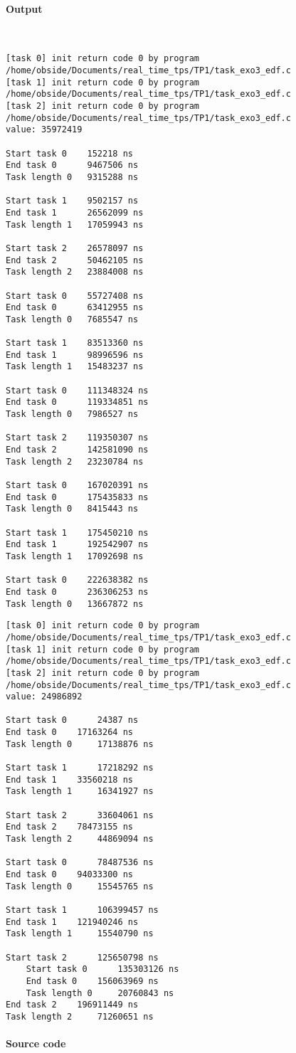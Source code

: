 \paragraph{Output}
\

\begin{lstlisting}[keywordstyle=\color{black}, caption={Output (reformatted) EDF 1\textsuperscript{st} set}]
[task 0] init return code 0 by program /home/obside/Documents/real_time_tps/TP1/task_exo3_edf.c
[task 1] init return code 0 by program /home/obside/Documents/real_time_tps/TP1/task_exo3_edf.c
[task 2] init return code 0 by program /home/obside/Documents/real_time_tps/TP1/task_exo3_edf.c
value: 35972419

Start task 0	152218 ns
End task 0		9467506 ns
Task length 0	9315288 ns

Start task 1	9502157 ns
End task 1		26562099 ns
Task length 1	17059943 ns

Start task 2	26578097 ns
End task 2		50462105 ns
Task length 2	23884008 ns

Start task 0	55727408 ns
End task 0		63412955 ns
Task length 0	7685547 ns

Start task 1	83513360 ns
End task 1		98996596 ns
Task length 1	15483237 ns

Start task 0	111348324 ns
End task 0		119334851 ns
Task length 0	7986527 ns

Start task 2	119350307 ns
End task 2		142581090 ns
Task length 2	23230784 ns

Start task 0	167020391 ns
End task 0		175435833 ns
Task length 0	8415443 ns

Start task 1	175450210 ns
End task 1		192542907 ns
Task length 1	17092698 ns

Start task 0	222638382 ns
End task 0		236306253 ns
Task length 0	13667872 ns
\end{lstlisting}

\begin{lstlisting}[keywordstyle=\color{black}, caption={Output (reformatted) EDF 2\textsuperscript{nd} set}]
[task 0] init return code 0 by program /home/obside/Documents/real_time_tps/TP1/task_exo3_edf.c
[task 1] init return code 0 by program /home/obside/Documents/real_time_tps/TP1/task_exo3_edf.c
[task 2] init return code 0 by program /home/obside/Documents/real_time_tps/TP1/task_exo3_edf.c
value: 24986892

Start task 0	  24387 ns
End task 0	  17163264 ns
Task length 0	  17138876 ns

Start task 1	  17218292 ns
End task 1	  33560218 ns
Task length 1	  16341927 ns

Start task 2	  33604061 ns
End task 2	  78473155 ns
Task length 2	  44869094 ns

Start task 0	  78487536 ns
End task 0	  94033300 ns
Task length 0	  15545765 ns

Start task 1	  106399457 ns
End task 1	  121940246 ns
Task length 1	  15540790 ns

Start task 2	  125650798 ns
	Start task 0	  135303126 ns
	End task 0	  156063969 ns
	Task length 0	  20760843 ns
End task 2	  196911449 ns
Task length 2	  71260651 ns
\end{lstlisting}

\paragraph{Source code}
\



